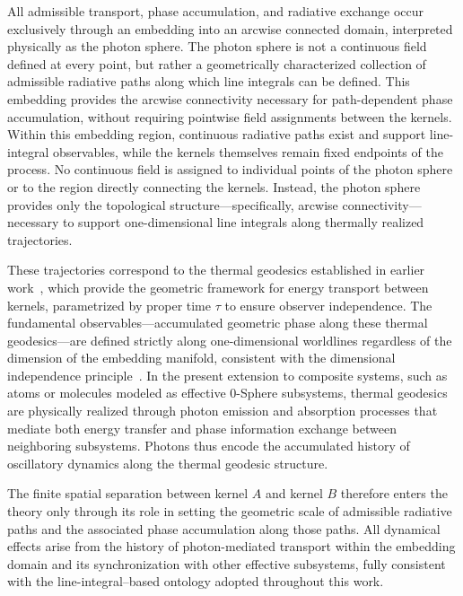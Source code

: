 \documentclass[%
 reprint,
 amsmath,amssymb,
 aps,
 prb,
]{revtex4-2}
\numberwithin{equation}{section}
\begin{document}
All admissible transport, phase accumulation, and radiative exchange occur exclusively through an embedding into an arcwise connected domain, interpreted physically as the photon sphere. The photon sphere is not a continuous field defined at every point, but rather a geometrically characterized collection of admissible radiative paths along which line integrals can be defined. This embedding provides the arcwise connectivity necessary for path-dependent phase accumulation, without requiring pointwise field assignments between the kernels. Within this embedding region, continuous radiative paths exist and support line-integral observables, while the kernels themselves remain fixed endpoints of the process. No continuous field is assigned to individual points of the photon sphere or to the region directly connecting the kernels. Instead, the photon sphere provides only the topological structure---specifically, arcwise connectivity---necessary to support one-dimensional line integrals along thermally realized trajectories.

These trajectories correspond to the thermal geodesics established in earlier work~\cite{Hanamura2025Trilogy1}, which provide the geometric framework for energy transport between kernels, parametrized by proper time $\tau$ to ensure observer independence. The fundamental observables---accumulated geometric phase along these thermal geodesics---are defined strictly along one-dimensional worldlines regardless of the dimension of the embedding manifold, consistent with the dimensional independence principle~\cite{Hanamura2025Trilogy1}. In the present extension to composite systems, such as atoms or molecules modeled as effective 0-Sphere subsystems, thermal geodesics are physically realized through photon emission and absorption processes that mediate both energy transfer and phase information exchange between neighboring subsystems. Photons thus encode the accumulated history of oscillatory dynamics along the thermal geodesic structure.

The finite spatial separation between kernel $A$ and kernel $B$ therefore enters the theory only through its role in setting the geometric scale of admissible radiative paths and the associated phase accumulation along those paths. All dynamical effects arise from the history of photon-mediated transport within the embedding domain and its synchronization with other effective subsystems, fully consistent with the line-integral--based ontology adopted throughout this work.
\end{document}
